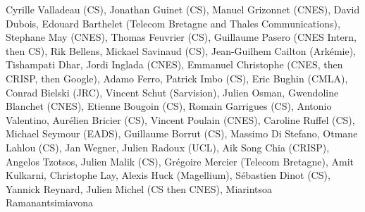 Cyrille Valladeau (CS), Jonathan Guinet (CS), Manuel Grizonnet (CNES), David Dubois, Edouard Barthelet (Telecom Bretagne and Thales Communications), Stephane May (CNES), Thomas Feuvrier (CS), Guillaume Pasero (CNES Intern, then CS), Rik Bellens, Mickael Savinaud (CS), Jean-Guilhem Cailton (Ark\'emie), Tishampati Dhar, Jordi Inglada (CNES), Emmanuel Christophe (CNES, then CRISP, then Google), Adamo Ferro, Patrick Imbo (CS), Eric Bughin (CMLA), Conrad Bielski (JRC), Vincent Schut (Sarvision), Julien Osman, Gwendoline Blanchet (CNES), Etienne Bougoin (CS), Romain Garrigues (CS), Antonio Valentino, Aur\'elien Bricier (CS), Vincent Poulain (CNES), Caroline Ruffel (CS), Michael Seymour (EADS), Guillaume Borrut (CS), Massimo Di Stefano, Otmane Lahlou (CS), Jan Wegner, Julien Radoux (UCL), Aik Song Chia (CRISP), Angelos Tzotsos, Julien Malik (CS), Gr\'egoire Mercier (Telecom Bretagne), Amit Kulkarni, Christophe Lay, Alexis Huck (Magellium), S\'ebastien Dinot (CS), Yannick Reynard, Julien Michel (CS then CNES), Miarintsoa Ramanantsimiavona